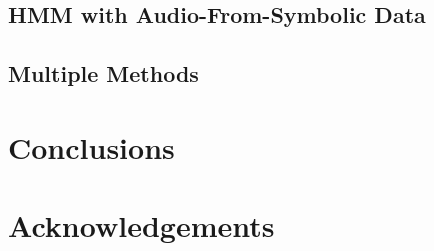 \documentclass{sig-alternate}
\begin{document}
\subsection{HMM with Audio-From-Symbolic Data}

\subsection{Multiple Methods}

\section{Conclusions}

\section{Acknowledgements}

\end{document}
